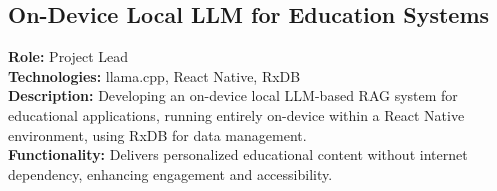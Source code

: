 \documentclass[11pt]{article}
\begin{document}
\subsection*{On-Device Local LLM for Education Systems}
\textbf{Role:} Project Lead \\
\textbf{Technologies:} llama.cpp, React Native, RxDB \\
\textbf{Description:} Developing an on-device local LLM-based RAG system for educational applications, running entirely on-device within a React Native environment, using RxDB for data management. \\
\textbf{Functionality:} Delivers personalized educational content without internet dependency, enhancing engagement and accessibility.
\end{document}

